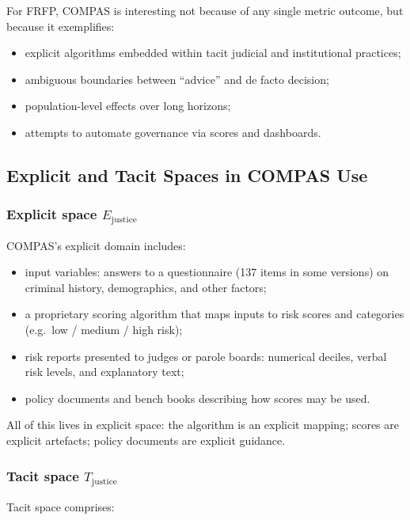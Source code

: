 For FRFP, COMPAS is interesting not because of any single metric outcome,
but because it exemplifies:

\begin{itemize}
  \item explicit algorithms embedded within tacit judicial and institutional
        practices;
  \item ambiguous boundaries between ``advice'' and de facto decision;
  \item population-level effects over long horizons;
  \item attempts to automate governance via scores and dashboards.
\end{itemize}

\subsection{Explicit and Tacit Spaces in COMPAS Use}

\subsubsection*{Explicit space \(E_{\mathrm{justice}}\)}

COMPAS’s explicit domain includes:

\begin{itemize}
  \item input variables: answers to a questionnaire (137 items in some
        versions) on criminal history, demographics, and other factors;
  \item a proprietary scoring algorithm that maps inputs to risk scores and
        categories (e.g.\ low / medium / high risk);
  \item risk reports presented to judges or parole boards: numerical deciles,
        verbal risk levels, and explanatory text;
  \item policy documents and bench books describing how scores may be used.
\end{itemize}

All of this lives in explicit space: the algorithm is an explicit mapping;
scores are explicit artefacts; policy documents are explicit guidance.

\subsubsection*{Tacit space \(T_{\mathrm{justice}}\)}

Tacit space comprises:

